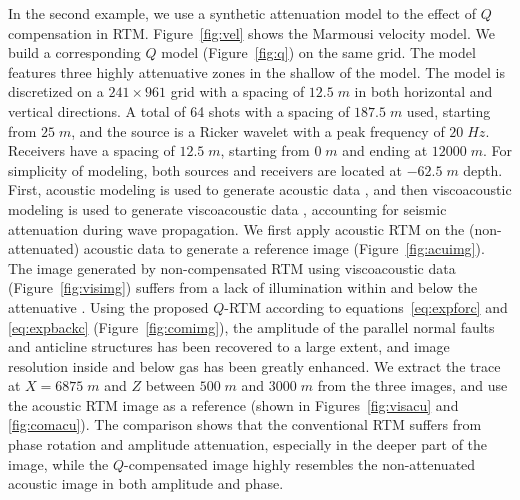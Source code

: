 In the second example, we use a synthetic attenuation model to  the effect of $Q$ compensation in RTM. Figure~\ref{fig:vel} shows the Marmousi velocity model. We build a corresponding $Q$ model (Figure~\ref{fig:q}) on the same grid. The model features three highly attenuative zones in the shallow  of the model. The model is discretized on a $241 \times 961$ grid with a spacing of $12.5\;m$ in both horizontal and vertical directions. A total of 64 shots with a spacing of $187.5\;m$  used, starting from $25\;m$, and the source is a Ricker wavelet with a peak frequency of $20\;Hz$. Receivers have a spacing of $12.5\;m$, starting from $0\;m$ and ending at $12000\;m$. For simplicity of modeling, both sources and receivers are located at $-62.5\;m$ depth. First, acoustic modeling is used to generate acoustic data , and then viscoacoustic modeling is used to generate viscoacoustic data , accounting for seismic attenuation during wave propagation. We first apply acoustic RTM on the (non-attenuated) acoustic data to generate a reference image (Figure~\ref{fig:acuimg}).
The image generated by non-compensated RTM using viscoacoustic data (Figure~\ref{fig:visimg}) suffers from a lack of illumination within and below the attenuative . Using the proposed $Q$-RTM according to equations~\ref{eq:expforc} and \ref{eq:expbackc} (Figure~\ref{fig:comimg}), the amplitude of the parallel normal faults and anticline structures has been recovered to a large extent, and image resolution inside and below gas has been greatly enhanced. We extract the trace at $X=6875\;m$ and $Z$ between $500\;m$ and $3000\;m$ from the three images, and use the acoustic RTM image  as a reference (shown in Figures~\ref{fig:visacu} and \ref{fig:comacu}). The comparison shows that the conventional RTM suffers from phase rotation and amplitude attenuation, especially in the deeper part of the image, while the $Q$-compensated image highly resembles the non-attenuated acoustic image in both amplitude and phase. 

